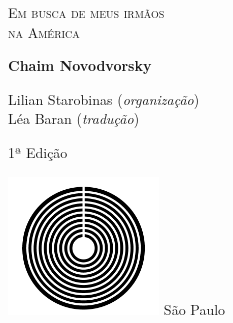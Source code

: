 




\begingroup\thispagestyle{empty}\vspace*{.05\textheight} 

              \formular
              \huge
              \noindent
              \textsc{Em busca de meus irmãos\\na América}
  					  \medskip
                      
  					  \large
              \textit{}
              \normalsize 
              \vspace{2em}

              \Large
              \noindent
              \textbf{Chaim Novodvorsky}
              \bigskip

              \small
              \noindent
              Lilian Starobinas (\textit{organização})\\
              Léa Baran (\textit{tradução})
              \vspace{3em}

              \noindent
   					  1ª Edição
                      

              \vfill
              \noindent
              \includegraphics[width=0.3\textwidth]{logo}
              \break{} São Paulo\quad\the\year
\endgroup
\pagebreak

